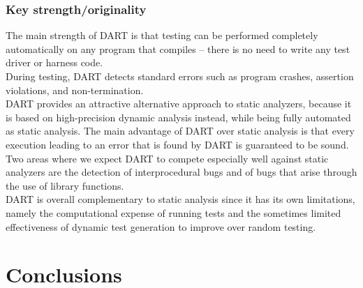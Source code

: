 \documentclass[11pt]{article}
\begin{document}
	    \subsubsection{Key strength/originality} 
	    	The main strength of DART is that testing can be performed completely automatically on any program that compiles – there is no need to write any test driver or harness code.\\
	    	During testing, DART detects standard errors such as program crashes, assertion violations, and non-termination.\\
	    	DART provides an attractive alternative approach to static analyzers, because it is based on high-precision dynamic analysis instead, while being fully automated as static analysis. The main advantage of DART over static analysis is that every execution leading to an error that is found by DART is guaranteed to be sound. Two areas where we expect DART to compete especially well against static analyzers are the detection of interprocedural bugs and of bugs that arise through the use of library functions.\\
	    	
	    	DART is overall complementary to static analysis since it has its own limitations, namely the computational expense of running tests and the sometimes limited effectiveness of dynamic test generation to improve over random testing.
    	

  \section{Conclusions}


\pagebreak
{}

\end{document}
